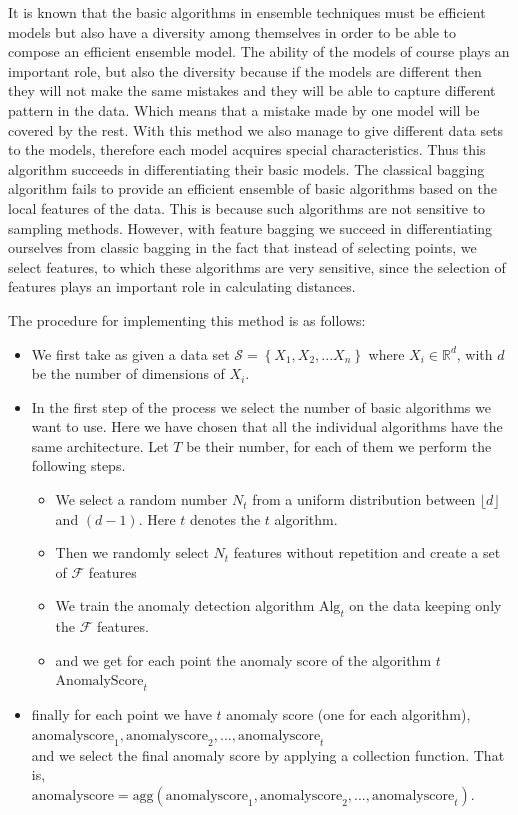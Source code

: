 \documentclass[a4paper,12pt]{report}
\theoremstyle{definitionNODot}
\begin{document}
	It is known that the basic algorithms in ensemble techniques must be efficient models but also have a diversity among themselves in order to be able to compose an efficient ensemble model. The ability of the models of course plays an important role, but also the diversity because if the models are different then they will not make the same mistakes and they will be able to capture different pattern in the data. Which means that a mistake made by one model will be covered by the rest. With this method we also manage to give different data sets to the models, therefore each model acquires special characteristics. Thus this algorithm succeeds in differentiating their basic models. The classical bagging algorithm fails to provide an efficient ensemble of basic algorithms based on the local features of the data. This is because such algorithms are not sensitive to sampling methods. However, with feature bagging we succeed in differentiating ourselves from classic bagging in the fact that instead of selecting points, we select features, to which these algorithms are very sensitive, since the selection of features plays an important role in calculating distances.
	
	The procedure for implementing this method is as follows: 
	
	\begin{itemize}
		\item We first take as given a data set $\mathcal{S} = \left\{ X_1, X_2,...X_n \right\}$ where $X_i\in\mathbb{R}^d$, with $d $ be the number of dimensions of $X_i$.
		\item In the first step of the process we select the number of basic algorithms we want to use. Here we have chosen that all the individual algorithms have the same architecture. Let $T$ be their number, for each of them we perform the following steps.
		
		\begin{itemize}
			
			\item We select a random number $N_t$ from a uniform distribution between $\lfloor d \rfloor$ and $(d-1)$. Here $t$ denotes the $t$ algorithm.
			\item Then we randomly select $N_t$ features without repetition and create a set of $\mathcal{F}$ features
			\item We train the anomaly detection algorithm $\text{Alg}_t$ on the data keeping only the $\mathcal{F}$ features.
			\item and we get for each point the anomaly score of the algorithm $t$ $\text{AnomalyScore}_t$
		\end{itemize}
		\item finally for each point we have $ t $ anomaly score (one for each algorithm), \\ $ \text{anomalyscore}_1, \text{anomalyscore}_2, ..., \text{anomalyscore}_t $ \\ and we select the final anomaly score by applying a collection function. That is, \\ $ \text{anomalyscore} = \text{agg} (\text{anomalyscore}_1, \text{anomalyscore}_2, ..., \text {anomalyscore}_t) $.
	\end{itemize}
	
\end{document}
